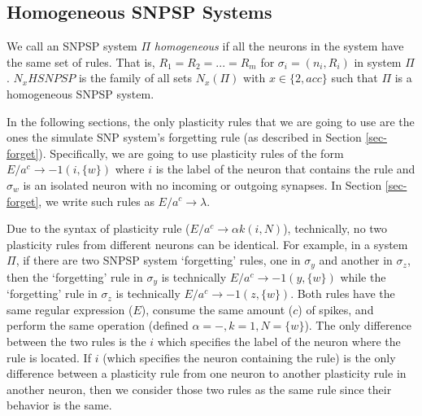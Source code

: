 \documentclass[smallextended]{svjour3}
\begin{document}

\subsection{Homogeneous SNPSP Systems}

\begin{definition}
We call an SNPSP system $\Pi$ \textit{homogeneous} if all the neurons in the system have the same set of rules. That is, $R_1 = R_2 = ... = R_m$
for $\sigma_i = (n_i, R_i)$ in system $\Pi$. $N_xHSNPSP$ is the family of all sets $N_x(\Pi)$ with $x \in \{2, acc\}$ such that $\Pi$ is a homogeneous
SNPSP system.  

\end{definition}

In the following sections, the only plasticity rules that we are going to use are the ones the simulate SNP system's forgetting rule (as described in
Section \ref{sec-forget}). Specifically, we are going to use plasticity rules of the form $E/a^c \rightarrow -1(i,\{w\})$ where $i$ is the label of
the neuron that contains the rule and $\sigma_w$ is an isolated neuron with no incoming or outgoing synapses. In Section \ref{sec-forget}, we write
such rules as $E/a^c \rightarrow \lambda$. 

Due to the syntax of plasticity rule ($E/a^c \rightarrow \alpha k (i, N)$), technically, no two plasticity rules from different neurons can be identical.
For example, in a system $\Pi$, if there are two SNPSP system `forgetting' rules, one in $\sigma_y$ and another in $\sigma_z$, then the `forgetting'
rule in $\sigma_y$ is technically  $E/a^c \rightarrow -1(y,\{w\})$ while the `forgetting' rule in $\sigma_z$ is technically $E/a^c \rightarrow -1(z,
\{w\})$. Both rules have the same regular expression ($E$), consume the same amount ($c$) of spikes, and perform the same operation (defined 
$\alpha = -, k=1, N=\{w\}$). The only difference between the two rules is the $i$ which specifies the label of the neuron where the rule is located.
If $i$ (which specifies the neuron containing the rule) is the only difference between a plasticity rule from one neuron to another plasticity rule
in another neuron, then we consider those two rules as the same rule since their behavior is the same.


\end{document}
